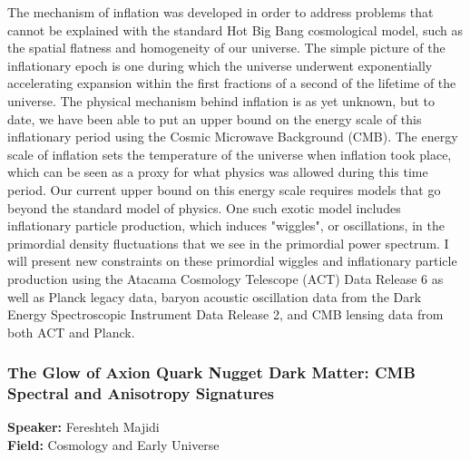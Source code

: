 The mechanism of inflation was developed in order to address problems that cannot be explained with the standard Hot Big Bang cosmological model, such as the spatial flatness and homogeneity of our universe. The simple picture of the inflationary epoch is one during which the universe underwent exponentially accelerating expansion within the first fractions of a second of the lifetime of the universe. The physical mechanism behind inflation is as yet unknown, but to date, we have been able to put an upper bound on the energy scale of this inflationary period using the Cosmic Microwave Background (CMB). The energy scale of inflation sets the temperature of the universe when inflation took place, which can be seen as a proxy for what physics was allowed during this time period. Our current upper bound on this energy scale requires models that go beyond the standard model of physics. One such exotic model includes inflationary particle production, which induces "wiggles", or oscillations, in the primordial density fluctuations that we see in the primordial power spectrum. I will present new constraints on these primordial wiggles and inflationary particle production using the Atacama Cosmology Telescope (ACT) Data Release 6 as well as Planck legacy data, baryon acoustic oscillation data from the Dark Energy Spectroscopic Instrument Data Release 2, and CMB lensing data from both ACT and Planck.

\hypertarget{abstract-talk-22}{}\label{abstract-page-talk-22}
\subsubsection*{The Glow of Axion Quark Nugget Dark Matter: CMB Spectral and Anisotropy Signatures}
\textbf{Speaker:} Fereshteh Majidi\\
\textbf{Field:} Cosmology and Early Universe

